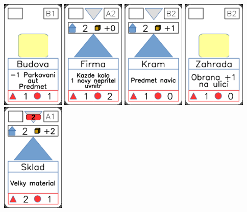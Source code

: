\documentclass[a4paper]{article}
\begin{document}
	\includegraphics[width=3.0cm]{img-2_5}
	\includegraphics[width=3.0cm]{img-3_16}
	\includegraphics[width=3.0cm]{img-3_6}
	\includegraphics[width=3.0cm]{img-2_21}
	\includegraphics[width=3.0cm]{img-3_15}
\end{document}
